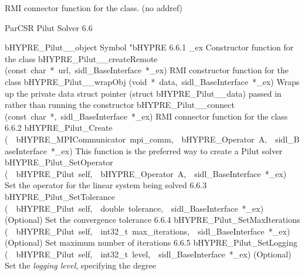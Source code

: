 \documentclass{article}
\begin{document}
\begin{cxxentry}
\begin{cxxentry}
\begin{cxxvariable}
\begin{cxxdoc}
RMI connector function for the class. (no addref)
\end{cxxdoc}
\end{cxxvariable}
\end{cxxentry}
\begin{cxxentry}
{}
        {ParCSR Pilut Solver}
        {}
        {
}
        {6.6}
\begin{cxxnames}
        {bHYPRE\_Pilut\_\_object}
        {}
        {
Symbol "bHYPRE}
        {6.6.1}
        {\_ex}
        {}
        {
Constructor function for the class}
        {}
\label{cxx.6.6.11}
        {bHYPRE\_Pilut\_\_createRemote}
        {(const\ char\ *\ url,\ sidl\_BaseInterface\ *\_ex)}
        {
RMI constructor function for the class}
        {}
\label{cxx.6.6.12}
        {bHYPRE\_Pilut\_\_wrapObj}
        {(void\ *\ data,\ sidl\_BaseInterface\ *\_ex)}
        {
Wraps up the private data struct pointer (struct bHYPRE\_Pilut\_\_data) passed in rather than running the constructor}
        {}
\label{cxx.6.6.13}
        {bHYPRE\_Pilut\_\_connect}
        {(const\ char\ *,\ sidl\_BaseInterface\ *\_ex)}
        {
RMI connector function for the class}
        {6.6.2}
        {bHYPRE\_Pilut\_Create}
        {(\ \ bHYPRE\_MPICommunicator\ mpi\_comm,\ \ bHYPRE\_Operator\ A,\ \ sidl\_BaseInterface\ *\_ex)}
        {
This function is the preferred way to create a Pilut solver}
        {}
\label{cxx.6.6.14}
        {bHYPRE\_Pilut\_SetOperator}
        {(\ \ bHYPRE\_Pilut\ self,\ \ bHYPRE\_Operator\ A,\ \ sidl\_BaseInterface\ *\_ex)}
        {
Set the operator for the linear system being solved}
        {6.6.3}
        {bHYPRE\_Pilut\_SetTolerance}
        {(\ \ bHYPRE\_Pilut\ self,\ \ double\ tolerance,\ \ sidl\_BaseInterface\ *\_ex)}
        {
(Optional) Set the convergence tolerance}
        {6.6.4}
        {bHYPRE\_Pilut\_SetMaxIterations}
        {(\ \ bHYPRE\_Pilut\ self,\ \ int32\_t\ max\_iterations,\ \ sidl\_BaseInterface\ *\_ex)}
        {
(Optional) Set maximum number of iterations}
        {6.6.5}
        {bHYPRE\_Pilut\_SetLogging}
        {(\ \ bHYPRE\_Pilut\ self,\ \ int32\_t\ level,\ \ sidl\_BaseInterface\ *\_ex)}
        {
(Optional) Set the {\it logging level}, specifying the degree
}
\end{cxxnames}
\end{cxxentry}
\end{cxxentry}
\end{document}
